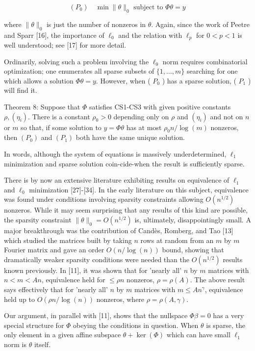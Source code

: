 \documentclass[10pt]{article}
\begin{document}
$$
\left(P_{0}\right) \quad \min \|\theta\|_{0} \text { subject to } \Phi \theta=y
$$

where $\|\theta\|_{0}$ is just the number of nonzeros in $\theta$. Again, since the work of Peetre and Sparr [16], the importance of $\ell_{0}$ and the relation with $\ell_{p}$ for $0<p<1$ is well understood; see [17] for more detail.

Ordinarily, solving such a problem involving the $\ell_{0}$ norm requires combinatorial optimization; one enumerates all sparse subsets of $\{1, \ldots, m\}$ searching for one which allows a solution $\Phi \theta=y$. However, when ( $P_{0}$ ) has a sparse solution, ( $P_{1}$ ) will find it.

Theorem 8: Suppose that $\Phi$ satisfies CS1-CS3 with given positive constants $\rho,\left(\eta_{i}\right)$. There is a constant $\rho_{0}>0$ depending only on $\rho$ and $\left(\eta_{i}\right)$ and not on $n$ or $m$ so that, if some solution to $y=\Phi \theta$ has at most $\rho_{0} n / \log (m)$ nonzeros, then $\left(P_{0}\right)$ and $\left(P_{1}\right)$ both have the same unique solution.

In words, although the system of equations is massively underdetermined, $\ell_{1}$ minimization and sparse solution coin-cide-when the result is sufficiently sparse.

There is by now an extensive literature exhibiting results on equivalence of $\ell_{1}$ and $\ell_{0}$ minimization [27]-[34]. In the early literature on this subject, equivalence was found under conditions involving sparsity constraints allowing $O\left(n^{1 / 2}\right)$ nonzeros. While it may seem surprising that any results of this kind are possible, the sparsity constraint $\|\theta\|_{0}=O\left(n^{1 / 2}\right)$ is, ultimately, disappointingly small. A major breakthrough was the contribution of Candès, Romberg, and Tao [13] which studied the matrices built by taking $n$ rows at random from an $m$ by $m$ Fourier matrix and gave an order $O(n / \log (n))$ bound, showing that dramatically weaker sparsity conditions were needed than the $O\left(n^{1 / 2}\right)$ results known previously. In [11], it was shown that for 'nearly all' $n$ by $m$ matrices with $n<m<A n$, equivalence held for $\leq \rho n$ nonzeros, $\rho=\rho(A)$. The above result says effectively that for 'nearly all' $n$ by $m$ matrices with $m \leq A n^{\gamma}$, equivalence held up to $O(\rho n / \log (n))$ nonzeros, where $\rho=\rho(A, \gamma)$.

Our argument, in parallel with [11], shows that the nullspace $\Phi \beta=0$ has a very special structure for $\Phi$ obeying the conditions in question. When $\theta$ is sparse, the only element in a given affine subspace $\theta+\operatorname{ker}(\Phi)$ which can have small $\ell_{1}$ norm is $\theta$ itself.
\end{document}
